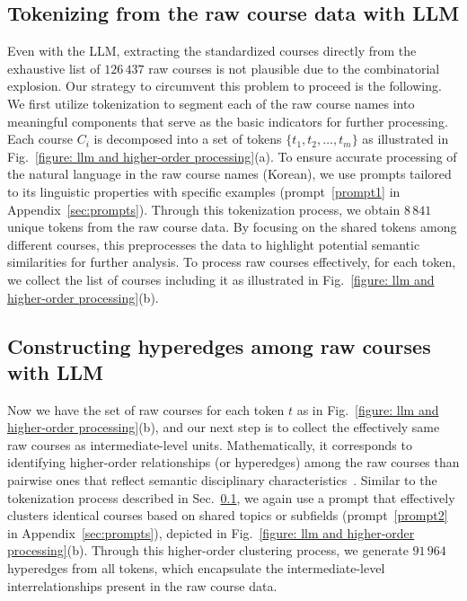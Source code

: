\documentclass{bmcart}
\begin{document}
\subsection{Tokenizing from the raw course data with LLM}
\label{sec:tokenizing}

Even with the LLM, extracting the standardized courses directly from the exhaustive list of $126\,437$ raw courses is not plausible due to the combinatorial explosion. Our strategy to circumvent this problem to proceed is the following. We first utilize tokenization to segment each of the raw course names into meaningful components that serve as the basic indicators for further processing. Each course \( C_i \) is decomposed into a set of tokens $\{t_1, t_2, \dots, t_m\}$ as illustrated in Fig.~\ref{figure: llm and higher-order processing}(a). 
To ensure accurate processing of the natural language in the raw course names (Korean), we use prompts tailored to its linguistic properties with specific examples (prompt~\ref{prompt1} in Appendix~\ref{sec:prompts}).
Through this tokenization process, we obtain $8\,841$ unique tokens from the raw course data. 
By focusing on the shared tokens among different courses, this preprocesses the data to highlight potential semantic similarities for further analysis. To process raw courses effectively, for each token, we collect the list of courses including it as illustrated in Fig.~\ref{figure: llm and higher-order processing}(b). 

\subsection{Constructing hyperedges among raw courses with LLM}
\label{sec:highorder_processing}

Now we have the set 
of raw courses for each token $t$ as in Fig.~\ref{figure: llm and higher-order processing}(b), and our next step is to collect the effectively same raw courses as intermediate-level units. Mathematically, it corresponds to identifying higher-order relationships (or hyperedges) among the raw courses than pairwise ones that reflect semantic disciplinary characteristics~\cite{Aksoy2020, Kumar2020, hypergraph2023, Citraro2023}. 
Similar to the tokenization process described in Sec.~\ref{sec:tokenizing}, we again use a prompt that effectively clusters identical courses based on shared topics or subfields (prompt~\ref{prompt2} in Appendix~\ref{sec:prompts}), depicted in Fig.~\ref{figure: llm and higher-order processing}(b).
Through this higher-order clustering process, we generate $91\,964$ hyperedges from all tokens, which encapsulate the intermediate-level interrelationships present in the raw course data.
\end{document}
